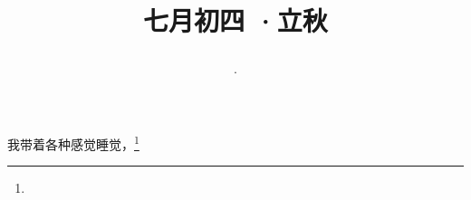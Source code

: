 \title{\date[d=7,m=8,y=2024][year:cn-y,年,month:cn,day:cn,日,·,weekday]·七月初四 ·立秋}
我带着各种感觉睡觉，\footnote{ }

